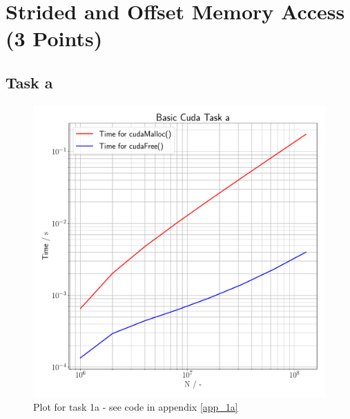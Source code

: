 \section{Strided and Offset Memory Access (3 Points)}

\subsection{Task a}
\begin{figure}[h]
    \begin{center}
        \includegraphics[width=1\textwidth]{figures/task_1_a.pdf}
        \caption{Plot for task 1a - see code in appendix \ref{app_1a}}
        \label{task_1_a_plot}
    \end{center}
\end{figure}
\pagebreak

